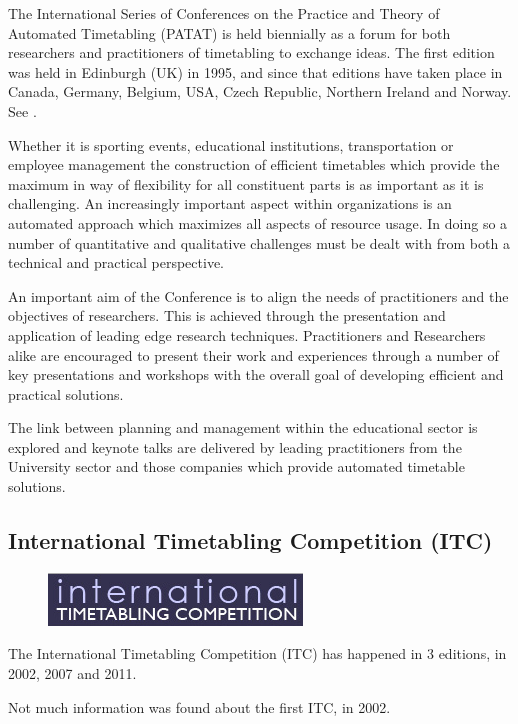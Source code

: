 The International Series of Conferences on the Practice and Theory of Automated Timetabling (PATAT) is held biennially as a forum for both researchers and practitioners of timetabling to exchange ideas. The first edition was held in Edinburgh (UK) in 1995, and since that editions have taken place in Canada, Germany, Belgium, USA, Czech Republic, Northern Ireland and Norway. See \cite{Patat}.

Whether it is sporting events, educational institutions, transportation or employee management the construction of efficient timetables which provide the maximum in way of flexibility for all constituent parts is as important as it is challenging. An increasingly important aspect within organizations is an automated approach which maximizes all aspects of resource usage. In doing so a number of quantitative and qualitative challenges must be dealt with from both a technical and practical perspective.

An important aim of the Conference is to align the needs of practitioners and the objectives of researchers. This is achieved through the presentation and application of leading edge research techniques. Practitioners and Researchers alike are encouraged to present their work and experiences through a number of key presentations and workshops with the overall goal of developing efficient and practical solutions.

The link between planning and management within the educational sector is explored and keynote talks are delivered by leading practitioners from the University sector and those companies which provide automated timetable solutions.


\subsection{International Timetabling Competition (ITC)}
\label{itc}

\begin{figure}[h]
\hfill\includegraphics[scale=0.8]{figures/itc.png}
\end{figure}

The International Timetabling Competition (ITC) has happened in 3 editions, in 2002, 2007 and 2011.

Not much information was found about the first ITC, in 2002.

